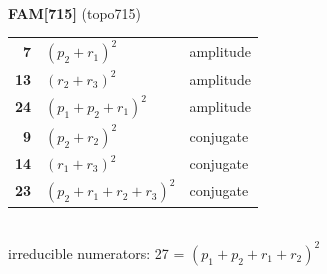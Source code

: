 \documentclass[10pt]{article}
\begin{document}
\begin{minipage}[t]{0.48\textwidth}
{}\\[2mm]\textbf{FAM[715]} (topo715)\\[2pt]{\footnotesize\begin{tabular}{@{}r@{\ \ }l@{\ \ }l@{}}\textbf{7} & $(p_2+r_1)^2$ & amplitude\\
\textbf{13} & $(r_2+r_3)^2$ & amplitude\\
\textbf{24} & $(p_1+p_2+r_1)^2$ & amplitude\\
\textbf{9} & $(p_2+r_2)^2$ & conjugate\\
\textbf{14} & $(r_1+r_3)^2$ & conjugate\\
\textbf{23} & $(p_2+r_1+r_2+r_3)^2$ & conjugate\\\end{tabular}}\\[2pt]{\scriptsize irreducible numerators: 27 = $(p_1+p_2+r_1+r_2)^2$}\end{minipage}

\bigskip
\end{document}
